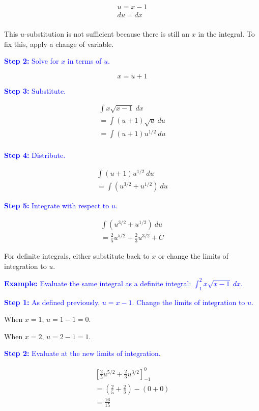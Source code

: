 \documentclass[letterpaper, 12pt]{article}
\newcommand{\example}[1]{\textcolor{blue}{\textbf{Example:} #1}}
\newcommand{\step}[2]{\textcolor{blue}{\textbf{Step #1:} #2}}
\begin{document}
\begin{gather*}
u = x - 1 \\
du = dx \\
\end{gather*}

This $u$-substitution is not sufficient because there is still an $x$ in the integral. To fix this, apply a change of variable.

\step{2}{Solve for $x$ in terms of $u$.}

$$ x = u + 1 $$

\step{3}{Substitute.}

\begin{gather*}
\int x\sqrt{x-1} \: dx \\
= \int (u + 1) \sqrt{u} \: du \\
= \int (u + 1) u^{1/2} \: du \\
\end{gather*}

\step{4}{Distribute.}

\begin{gather*}
\int (u+1) u^{1/2} \: du \\
= \int (u^{3/2} + u^{1/2}) \: du
\end{gather*}

\step{5}{Integrate with respect to $u$.}

\begin{gather*}
\int (u^{3/2} + u^{1/2}) \: du \\
= \boxed{\frac{2}{5} u^{5/2} + \frac{2}{3} u^{3/2} + C}
\end{gather*}

For definite integrals, either substitute back to $x$ or change the limits of integration to $u$.

\example{Evaluate the same integral as a definite integral: $\displaystyle \int_1^2 x\sqrt{x-1} \: dx$.}

\step{1}{As defined previously, $u = x - 1$. Change the limits of integration to $u$.}

When $x = 1$, $u = 1 - 1 = 0$.

When $x = 2$, $u = 2 - 1 = 1$.

\step{2}{Evaluate at the new limits of integration.}

\begin{gather*}
\left[ \frac{2}{5} u^{5/2} + \frac{2}{3} u^{3/2} \right]_{-1}^{0} \\
= \left(\frac{2}{5}+\frac{2}{3}\right) - (0+0) \\
= \boxed{\frac{16}{15}}
\end{gather*}
\end{document}
